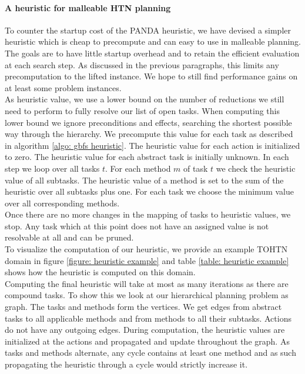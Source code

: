 \paragraph{A heuristic for malleable HTN planning}
To counter the startup cost of the PANDA heuristic, we have devised a simpler heuristic which is cheap to precompute and can easy to use in malleable planning. The goals are to have little startup overhead and to retain the efficient evaluation at each search step. As discussed in the previous paragraphs, this limits any precomputation to the lifted instance. We hope to still find performance gains on at least some problem instances. \\
As heuristic value, we use a lower bound on the number of reductions we still need to perform to fully resolve our list of open tasks. When computing this lower bound we ignore preconditions and effects, searching the shortest possible way through the hierarchy. We precompute this value for each task as described in algorithm \ref{algo: gbfs heuristic}. The heuristic value for each action is initialized to zero. The heuristic value for each abstract task is initially unknown. In each step we loop over all tasks $t$. For each method $m$ of task $t$ we check the heuristic value of all subtasks. The heuristic value of a method is set to the sum of the heuristic over all subtasks plus one. For each task we choose the minimum value over all corresponding methods. \\
Once there are no more changes in the mapping of tasks to heuristic values, we stop. Any task which at this point does not have an assigned value is not resolvable at all and can be pruned. \\
To visualize the computation of our heuristic, we provide an example TOHTN domain in figure \ref{figure: heuristic example} and table \ref{table: heuristic example} shows how the heuristic is computed on this domain. \\
Computing the final heuristic will take at most as many iterations as there are compound tasks. To show this we look at our hierarchical planning problem as graph. The tasks and methods form the vertices. We get edges from abstract tasks to all applicable methods and from methods to all their subtasks. Actions do not have any outgoing edges. During computation, the heuristic values are initialized at the actions and propagated and update throughout the graph. As tasks and methods alternate, any cycle contains at least one method and as such propagating the heuristic through a cycle would strictly increase it.\\
